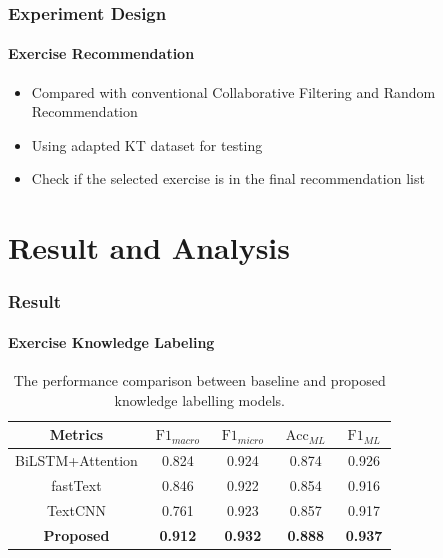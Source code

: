 \documentclass{beamer}
\begin{document}
\begin{frame}
  \frametitle{Experiment Design}
  \framesubtitle{Exercise Recommendation}
  \begin{itemize}
    \item Compared with conventional Collaborative Filtering and Random Recommendation
    \item Using adapted KT dataset for testing
    \item Check if the selected exercise is in the final recommendation list
  \end{itemize}
\end{frame}


\section{Result and Analysis}
\begin{frame}
  \frametitle{Result}
  \framesubtitle{Exercise Knowledge Labeling}
  \begin{table}[htbp!]
    \caption{The performance comparison between baseline and proposed knowledge labelling models.}\label{tbl:ch2-result-bsline1}
    \centering
    \begin{tabular}{ccccc}
      \toprule
      Metrics           & \(\operatorname{F1}_{macro}\) & \(\operatorname{F1}_{micro}\) & \(\operatorname{Acc}_{ML}\) & \(\operatorname{F1}_{ML}\) \\
      \midrule
      BiLSTM+Attention  & 0.824                         & 0.924                         & 0.874                       & 0.926                      \\
      fastText          & 0.846                         & 0.922                         & 0.854                       & 0.916                      \\
      TextCNN           & 0.761                         & 0.923                         & 0.857                       & 0.917                      \\
      \textbf{Proposed} & \textbf{0.912}                & \textbf{0.932}                & \textbf{0.888}              & \textbf{0.937}             \\
      \bottomrule
    \end{tabular}
  \end{table}
\end{frame}
\end{document}
